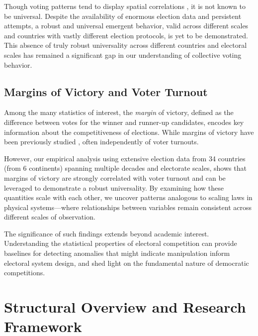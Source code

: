 Though voting patterns tend to display spatial correlations \cite{FerSucRam2014, BraDeA2017,MicIlkAtt2021,MorHisNak2019}, it is not known to be universal. Despite the availability of enormous election data and persistent attempts, a robust and universal emergent behavior, valid across different scales and countries with vastly different election protocols, is yet to be demonstrated. This absence of truly robust universality across different countries and electoral scales has remained a significant gap in our understanding of collective voting behavior.

\subsection{Margins of Victory and Voter Turnout}
Among the many statistics of interest, the \emph{margin} of victory, defined as the difference between votes for the winner and runner-up candidates, encodes key information about the competitiveness of elections. While margins of victory have been previously studied \cite{jacobson1987marginals, mccann1997threatening, mulligan2003empirical, magrino2011computing, xia2012computing, bhattacharyya2021predicting}, often independently of voter turnouts. 

However, our empirical analysis using extensive election data \cite{india_data, clea, canada_data, DVN/VOQCHQ_2018} from 34 countries (from 6 continents) spanning multiple decades and electorate scales, shows that margins of victory are strongly correlated with voter turnout and can be leveraged to demonstrate a robust universality. By examining how these quantities scale with each other, we uncover patterns analogous to scaling laws in physical systems—where relationships between variables remain consistent across different scales of observation.

The significance of such findings extends beyond academic interest. Understanding the statistical properties of electoral competition can provide baselines for detecting anomalies that might indicate manipulation \cite{brigaldino2011elections, frear2014parliamentary, belarus_report, czwolek2021belarusian, bedford_2021, klimek2012statistical, jimenez2017testing} inform electoral system design, and shed light on the fundamental nature of democratic competitions.

\section{Structural Overview and Research Framework}


